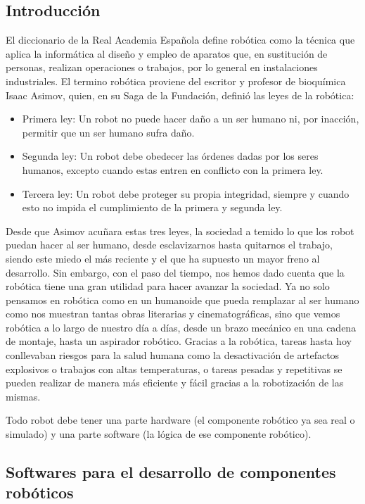 \subsection{Introducción}
El diccionario de la Real Academia Española define robótica como la técnica que aplica la informática al diseño y empleo de aparatos que, en sustitución de personas, realizan operaciones o trabajos, por lo general en instalaciones industriales. El termino robótica proviene del escritor y profesor de bioquímica Isaac Asimov, quien, en su Saga de la Fundación, definió las leyes de la robótica:
\begin{itemize}
	\item Primera ley: Un robot no puede hacer daño a un ser humano ni, por inacción, permitir que un ser humano sufra daño.
	\item Segunda ley: Un robot debe obedecer las órdenes dadas por los seres humanos, excepto cuando estas entren en conflicto con la primera ley.
	\item Tercera ley: Un robot debe proteger su propia integridad, siempre y cuando esto no impida el cumplimiento de la primera y segunda ley.
\end{itemize}
Desde que Asimov acuñara estas tres leyes, la sociedad a temido lo que los robot puedan hacer al ser humano, desde esclavizarnos hasta quitarnos el trabajo, siendo este miedo el más reciente y el que ha supuesto un mayor freno al desarrollo. Sin embargo, con el paso del tiempo, nos hemos dado cuenta que la robótica tiene una gran utilidad para hacer avanzar la sociedad. Ya no solo pensamos en robótica como en un humanoide que pueda remplazar al ser humano como nos muestran tantas obras literarias y cinematográficas, sino que vemos robótica a lo largo de nuestro día a días, desde un brazo mecánico en una cadena de montaje, hasta un aspirador robótico. Gracias a la robótica, tareas hasta hoy conllevaban riesgos para la salud humana como la desactivación de artefactos explosivos o trabajos con altas temperaturas, o tareas pesadas y repetitivas se pueden realizar de manera más eficiente y fácil gracias a la robotización de las mismas.

Todo robot debe tener una parte hardware (el componente robótico ya sea real o simulado) y una parte software (la lógica de ese componente robótico).

\subsection{Softwares para el desarrollo de componentes robóticos}

